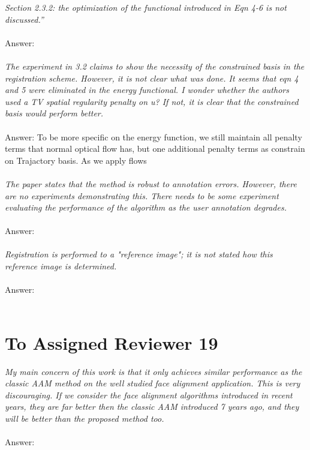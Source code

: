 \textit{Section 2.3.2: the optimization of the functional introduced in Eqn 4-6 is not discussed.”}
\\ \\
Answer:
\\ \\
\textit{The experiment in 3.2 claims to show the necessity of the constrained basis in the registration scheme. However, it is not clear what was done. It seems that eqn 4 and 5 were eliminated in the energy functional. I wonder whether the authors used a TV spatial regularity penalty on u? If not, it is clear that the constrained basis would perform better.}
\\ \\
Answer:
To be more specific on the energy function, we still maintain all penalty terms that normal optical flow has, but one additional penalty terms as constrain on Trajactory basis. As we apply flows
\\ \\
\textit{The paper states that the method is robust to annotation errors. However, there are no experiments demonstrating this. There needs to be some experiment evaluating the performance of the algorithm as the user annotation degrades.}
\\ \\
Answer:
\\ \\
\textit{Registration is performed to a "reference image"; it is not stated how this reference image is determined.}
\\ \\
Answer:
\\ \\

\section{To Assigned Reviewer 19}
\textit{My main concern of this work is that it only achieves similar performance as the classic AAM method on the well studied face alignment application. This is very discouraging. If we consider the face alignment algorithms introduced in recent years, they are far better then the classic AAM introduced 7 years ago, and they will be better than the proposed method too.}
\\ \\
Answer:

